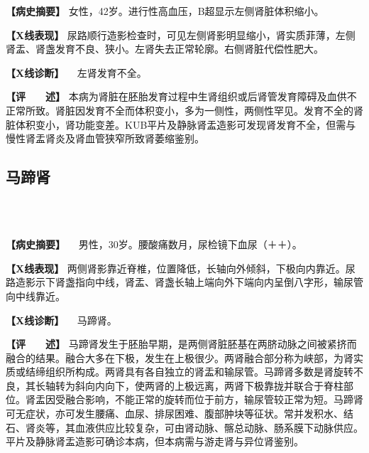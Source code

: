\textbf{【病史摘要】}
女性，42岁。进行性高血压，B超显示左侧肾脏体积缩小。

\textbf{【X线表现】}
尿路顺行造影检查时，可见左侧肾影明显缩小，肾实质菲薄，左侧肾盂、肾盏发育不良、狭小。左肾失去正常轮廓。右侧肾脏代偿性肥大。

\textbf{【X线诊断】} 　左肾发育不全。

\textbf{【评　　述】}
本病为肾脏在胚胎发育过程中生肾组织或后肾管发育障碍及血供不正常所致。肾脏因发育不全而体积变小，多为一侧性，两侧性罕见。发育不全的肾脏体积变小，肾功能变差。KUB平片及静脉肾盂造影可发现肾发育不全，但需与慢性肾盂肾炎及肾血管狭窄所致肾萎缩鉴别。

\subsection{马蹄肾}

\begin{figure}
    \centering
    \\
        \\
    \caption{}
    \label{fig6-2-5}
\end{figure}


\textbf{【病史摘要】} 　男性，30岁。腰酸痛数月，尿检镜下血尿（＋＋）。

\textbf{【X线表现】}
两侧肾影靠近脊椎，位置降低，长轴向外倾斜，下极向内靠近。尿路造影示下肾盏指向中线，肾盂、肾盏长轴上端向外下端向内呈倒八字形，输尿管向中线靠近。

\textbf{【X线诊断】} 　马蹄肾。

\textbf{【评　　述】}
马蹄肾发生于胚胎早期，是两侧肾脏胚基在两脐动脉之间被紧挤而融合的结果。融合大多在下极，发生在上极很少。两肾融合部分称为峡部，为肾实质或结缔组织所构成。两肾具有各自独立的肾盂和输尿管。马蹄肾多数是肾旋转不良，其长轴转为斜向内向下，使两肾的上极远离，两肾下极靠拢并联合于脊柱部位。肾盂因受融合影响，不能正常的旋转而位于前方，输尿管较正常为短。马蹄肾可无症状，亦可发生腰痛、血尿、排尿困难、腹部肿块等征状。常并发积水、结石、肾炎等，其血液供应比较复杂，可由肾动脉、髂总动脉、肠系膜下动脉供应。平片及静脉肾盂造影可确诊本病，但本病需与游走肾与异位肾鉴别。

